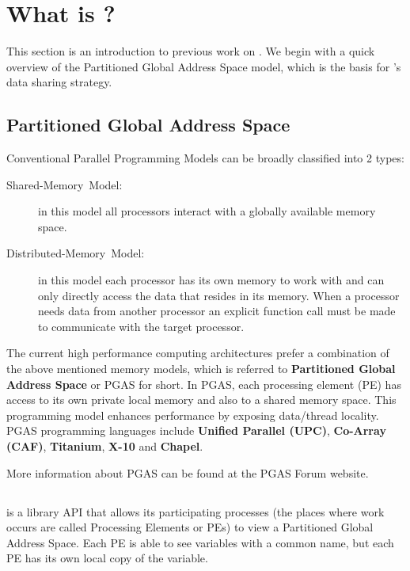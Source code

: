 
\section{What is \openshmem?}

This section is an introduction to previous work on \openshmem. We begin
with a quick overview of the Partitioned Global Address Space model,
which is the basis for \openshmem's data sharing strategy.


\subsection{Partitioned Global Address Space}

Conventional Parallel Programming Models can be broadly classified
into 2 types: 
\begin{description}
\item [{{Shared-Memory~Model:}}] in this model all processors interact
with a globally available memory space. 
\item [{{Distributed-Memory~Model:}}] in this model each processor has
its own memory to work with and can only directly access the data
that resides in its memory. When a processor needs data from another
processor an explicit function call must be made to communicate with
the target processor. 
\end{description}
The current high performance computing architectures prefer a combination
of the above mentioned memory models, which is referred to \textbf{Partitioned
Global Address Space} or PGAS for short. In PGAS, each processing
element (\ac{PE}) has access to its own private local memory and also to
a shared memory space. This programming model enhances performance
by exposing data/thread locality. PGAS programming languages include
\textbf{Unified Parallel \Clang (UPC)}, \textbf{Co-Array \Fortran (CAF)},
\textbf{Titanium}, \textbf{X-10} and \textbf{Chapel}.

More information about PGAS can be found at the PGAS Forum website.\cite{pgasfor}


\subsection{\openshmem}

%

\openshmem is a library API that allows its participating processes (the
places where work occurs are called Processing Elements or \ac{PE}s) to
view a Partitioned Global Address Space. Each \ac{PE} is able to see
variables with a common name, but each \ac{PE} has its own local copy
of the variable.

